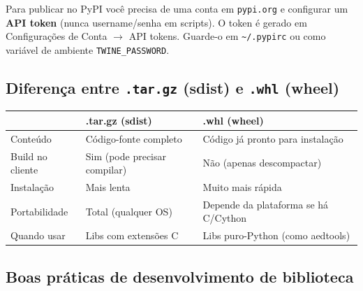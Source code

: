 \begin{AttentionBox}
Para publicar no PyPI você precisa de uma conta em \texttt{pypi.org} e
configurar um \textbf{API token} (nunca username/senha em scripts).
O token é gerado em Configurações de Conta $\to$ API tokens.
Guarde-o em \texttt{\textasciitilde/.pypirc} ou como variável de ambiente
\texttt{TWINE\_PASSWORD}.
\end{AttentionBox}

\subsection*{Diferença entre \texttt{.tar.gz} (sdist) e \texttt{.whl} (wheel)}

\begin{center}
\renewcommand{\arraystretch}{1.2}
\begin{tabular}{@{}l p{5cm} p{5.5cm}@{}}
\toprule
& \textbf{.tar.gz (sdist)} & \textbf{.whl (wheel)} \\
\midrule
Conteúdo & Código-fonte completo & Código já pronto para instalação \\
Build no cliente & Sim (pode precisar compilar) & Não (apenas descompactar) \\
Instalação & Mais lenta & Muito mais rápida \\
Portabilidade & Total (qualquer OS) & Depende da plataforma se há C/Cython \\
Quando usar & Libs com extensões C & Libs puro-Python (como aedtools) \\
\bottomrule
\end{tabular}
\end{center}

\subsection*{Boas práticas de desenvolvimento de biblioteca}

